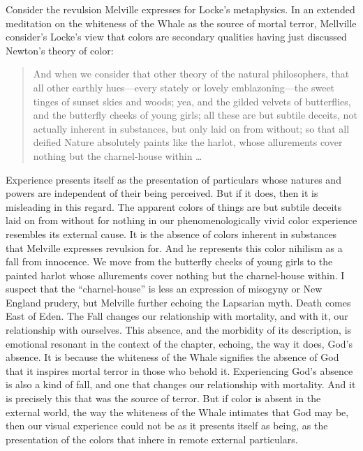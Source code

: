 Consider the revulsion Melville expresses for Locke's \citeyearpar{Locke:1706hc} metaphysics. In an extended meditation on the whiteness of the Whale as the source of mortal terror, Mellville consider's Locke's view that colors are secondary qualities having just discussed Newton's theory of color:
\begin{quote}
	And when we consider that other theory of the natural philosophers, that all other earthly hues---every stately or lovely emblazoning---the sweet tinges of sunset skies and woods; yea, and the gilded velvets of butterflies, and the butterfly cheeks of young girls; all these are but subtile deceits, not actually inherent in substances, but only laid on from without; so that all deified Nature absolutely paints like the harlot, whose allurements cover nothing but the charnel-house within \ldots\ \citep[ch. 42]{Melville:1851ms}
\end{quote}
Experience presents itself as the presentation of particulars whose natures and powers are independent of their being perceived. But if it does, then it is misleading in this regard. The apparent colors of things are but subtile deceits laid on from without for nothing in our phenomenologically vivid color experience resembles its external cause. It is the absence of colors inherent in substances that Melville expresses revulsion for. And he represents this color nihilism as a fall from innocence. We move from the butterfly cheeks of young girls to the painted harlot whose allurements cover nothing but the charnel-house within. I suspect that the ``charnel-house'' is less an expression of misogyny or New England prudery, but Melville further echoing the Lapsarian myth. Death comes East of Eden. The Fall changes our relationship with mortality, and with it, our relationship with ourselves. This absence, and the morbidity of its description, is emotional resonant in the context of the chapter, echoing, the way it does, God's absence. It is because the whiteness of the Whale signifies the absence of God that it inspires mortal terror in those who behold it. Experiencing God's absence is also a kind of fall, and one that changes our relationship with mortality. And it is precisely this that was the source of terror. But if color is absent in the external world, the way the whiteness of the Whale intimates that God may be, then our visual experience could not be as it presents itself as being, as the presentation of the colors that inhere in remote external particulars.


